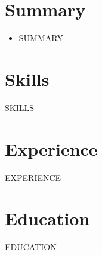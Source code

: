 \section{Summary}
\begin{itemize}[leftmargin=0pt, label={}, topsep=0pt, partopsep=0pt, parsep=0pt, itemsep=0pt]
\item\small{SUMMARY}
\end{itemize}

\section{Skills}
\resumeSkillsStart
SKILLS
\resumeSkillsEnd

\section{Experience}
\begin{itemize}[leftmargin=0pt, label={}, topsep=0pt, partopsep=0pt, parsep=0pt, itemsep=\resumeEntrySep]
EXPERIENCE
\end{itemize}

\section{Education}
\begin{itemize}[leftmargin=0pt, label={}, topsep=0pt, partopsep=0pt, parsep=0pt, itemsep=\resumeEntrySep]
EDUCATION
\end{itemize}


